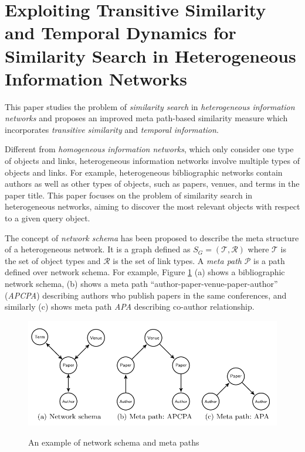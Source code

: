 \documentclass[paper=a4, fontsize=18pt]{article} %
\numberwithin{equation}{section} %
\numberwithin{figure}{section} %
\numberwithin{table}{section} %
\begin{document}
\section{Exploiting Transitive Similarity and Temporal Dynamics for Similarity Search in Heterogeneous Information Networks \cite{HBZ14}}

This paper studies the problem of \emph{similarity search} in \emph{heterogeneous information networks} and proposes an improved meta path-based similarity measure which incorporates \emph{transitive similarity} and \emph{temporal information}.

Different from \emph{homogeneous information networks}, which only consider one type of objects and links, heterogeneous information networks involve multiple types of objects and links. For example, heterogeneous bibliographic networks contain authors as well as other types of objects, such as papers, venues, and terms in the paper title. This paper focuses on the problem of similarity search in heterogeneous networks, aiming to discover the most relevant objects with respect to a given query object.

The concept of \emph{network schema} \cite{SHYYW11} has been proposed to describe the meta structure of a heterogeneous network. It is a graph defined as $S_G = (\mathcal{T}, \mathcal{R})$ where $\mathcal{T}$ is the set of object types and $\mathcal{R}$ is the set of link types. A \emph{meta path} $\mathcal{P}$ is a path defined over network schema. For example, Figure \ref{fig:schema} (a) shows a bibliographic network schema, (b) shows a meta path ``author-paper-venue-paper-author'' (\emph{APCPA}) describing authors who publish papers in the same conferences, and similarly (c) shows meta path \emph{APA} describing co-author relationship.

\begin{figure}[h]
  \centering
  \includegraphics[width=.7\linewidth]{8_1_schema.png}\\
  \caption{An example of network schema and meta paths}\label{fig:schema}
\end{figure}
\end{document}
